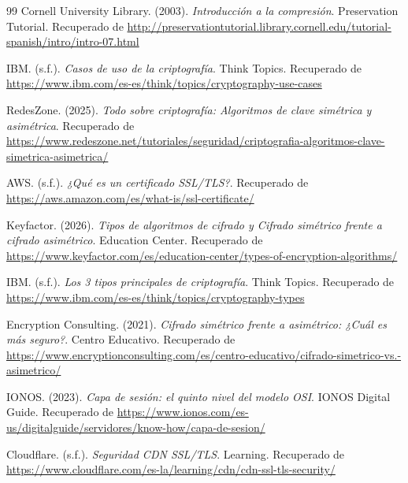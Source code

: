 \documentclass[a4paper,12pt]{article}
\begin{document}
\begin{thebibliography}{99}
Cornell University Library. (2003). \textit{Introducción a la compresión}. Preservation Tutorial. Recuperado de \url{http://preservationtutorial.library.cornell.edu/tutorial-spanish/intro/intro-07.html}

IBM. (s.f.). \textit{Casos de uso de la criptografía}. Think Topics. Recuperado de \url{https://www.ibm.com/es-es/think/topics/cryptography-use-cases}

RedesZone. (2025). \textit{Todo sobre criptografía: Algoritmos de clave simétrica y asimétrica}. Recuperado de \url{https://www.redeszone.net/tutoriales/seguridad/criptografia-algoritmos-clave-simetrica-asimetrica/}

AWS. (s.f.). \textit{¿Qué es un certificado SSL/TLS?}. Recuperado de \url{https://aws.amazon.com/es/what-is/ssl-certificate/}

Keyfactor. (2026). \textit{Tipos de algoritmos de cifrado y Cifrado simétrico frente a cifrado asimétrico}. Education Center. Recuperado de \url{https://www.keyfactor.com/es/education-center/types-of-encryption-algorithms/}

IBM. (s.f.). \textit{Los 3 tipos principales de criptografía}. Think Topics. Recuperado de \url{https://www.ibm.com/es-es/think/topics/cryptography-types}

Encryption Consulting. (2021). \textit{Cifrado simétrico frente a asimétrico: ¿Cuál es más seguro?}. Centro Educativo. Recuperado de \url{https://www.encryptionconsulting.com/es/centro-educativo/cifrado-simetrico-vs.-asimetrico/}

IONOS. (2023). \textit{Capa de sesión: el quinto nivel del modelo OSI}. IONOS Digital Guide. Recuperado de \url{https://www.ionos.com/es-us/digitalguide/servidores/know-how/capa-de-sesion/}

Cloudflare. (s.f.). \textit{Seguridad CDN SSL/TLS}. Learning. Recuperado de \url{https://www.cloudflare.com/es-la/learning/cdn/cdn-ssl-tls-security/}

\end{thebibliography}
\end{document}
